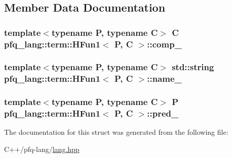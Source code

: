 \subsection{Member Data Documentation}
\hypertarget{structpfq__lang_1_1term_1_1HFun1_a16b8c06ef73b339272e21dbfd5be962c}{
\subsubsection[{comp\+\_\+}]{\setlength{\rightskip}{0pt plus 5cm}template$<$typename P, typename C$>$ C {\bf pfq\+\_\+lang\+::term\+::\+H\+Fun1}$<$ P, C $>$\+::comp\+\_\+}}\label{structpfq__lang_1_1term_1_1HFun1_a16b8c06ef73b339272e21dbfd5be962c}
\hypertarget{structpfq__lang_1_1term_1_1HFun1_ac37e99de5e6350b504a03f0e03d725c4}{
\subsubsection[{name\+\_\+}]{\setlength{\rightskip}{0pt plus 5cm}template$<$typename P, typename C$>$ std\+::string {\bf pfq\+\_\+lang\+::term\+::\+H\+Fun1}$<$ P, C $>$\+::name\+\_\+}}\label{structpfq__lang_1_1term_1_1HFun1_ac37e99de5e6350b504a03f0e03d725c4}
\hypertarget{structpfq__lang_1_1term_1_1HFun1_ac15b6e2665e60ad7f1700797c7677ea6}{
\subsubsection[{pred\+\_\+}]{\setlength{\rightskip}{0pt plus 5cm}template$<$typename P, typename C$>$ P {\bf pfq\+\_\+lang\+::term\+::\+H\+Fun1}$<$ P, C $>$\+::pred\+\_\+}}\label{structpfq__lang_1_1term_1_1HFun1_ac15b6e2665e60ad7f1700797c7677ea6}


The documentation for this struct was generated from the following file\+:\begin{DoxyCompactItemize}
\item 
C++/pfq-\/lang/\hyperlink{lang_8hpp}{lang.\+hpp}\end{DoxyCompactItemize}
